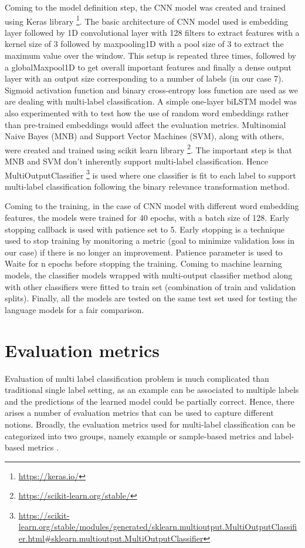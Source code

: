 Coming to the model definition step, the CNN model was created and trained using Keras library \footnote{\url{https://keras.io/}}. The basic architecture of CNN model used is embedding layer followed by 1D convolutional layer with 128 filters to extract features with a kernel size of 3 followed by maxpooling1D with a pool size of 3 to extract the maximum value over the window. This setup is repeated three times, followed by a globalMaxpool1D to get overall important features and finally a dense output layer with an output size corresponding to a number of labels (in our case 7). Sigmoid activation function and binary cross-entropy loss function are used as we are dealing with multi-label classification. A simple one-layer biLSTM model was also experimented with to test how the use of random word embeddings rather than pre-trained embeddings would affect the evaluation metrics. Multinomial Naive Bayes (MNB) and Support Vector Machines (SVM), along with others, were created and trained using scikit learn library \footnote{\url{https://scikit-learn.org/stable/}}. The important step is that MNB and SVM don't inherently support multi-label classification. Hence MultiOutputClassifier \footnote{\url{https://scikit-learn.org/stable/modules/generated/sklearn.multioutput.MultiOutputClassifier.html#sklearn.multioutput.MultiOutputClassifier}} is used where one classifier is fit to each label to support multi-label classification following the binary relevance transformation method.

Coming to the training, in the case of CNN model with different word embedding features, the models were trained for 40 epochs, with a batch size of 128. Early stopping callback is used with patience set to 5.
Early stopping is a technique used to stop training by monitoring a metric (goal to minimize validation loss in our case) if there is no longer an improvement. Patience parameter is used to Waite for n epochs before stopping the training. Coming to machine learning models, the classifier models wrapped with multi-output classifier method along with other classifiers were fitted to train set (combination of train and validation splits). Finally, all the models are tested on the same test set used for testing the language models for a fair comparison.

\section{Evaluation metrics} \label{Evaluation_metrics}
Evaluation of multi label classification problem is much complicated than traditional single label setting, as an example can be associated to multiple labels and the predictions of the learned model could be partially correct\cite{sorower2010literature}\cite{zhang2013review}. Hence, there arises a number of evaluation metrics that can be used to capture different notions. 
Broadly, the evaluation metrics used for multi-label classification can be categorized into two groups, namely example or sample-based metrics and label-based metrics \cite{zhang2013review}.
\\

